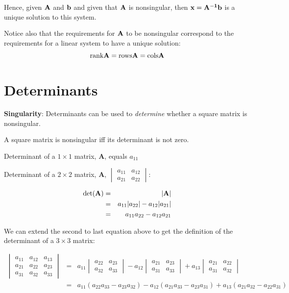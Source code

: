\documentclass[]{book}
\theoremstyle{definition}
\theoremstyle{definition}
\theoremstyle{definition}
\theoremstyle{remark}
\begin{document}
Hence, given \(\bf{A}\) and \(\bf{b}\) and given that \(\bf{A}\) is
nonsingular, then \(\bf{x} = \bf{A}^{-1} \bf{b}\) is a unique solution
to this system.

Notice also that the requirements for \(\bf{A}\) to be nonsingular
correspond to the requirements for a linear system to have a unique
solution: \[\text{rank}\bf{A} = \text{rows}\bf{A} = \text{cols}\bf{A}\]

\section{Determinants}\label{determinants}

\textbf{Singularity}: Determinants can be used to \emph{determine}
whether a square matrix is nonsingular.

A square matrix is nonsingular iff its determinant is not zero.

Determinant of a \(1 \times 1\) matrix, \textbf{A}, equals \(a_{11}\)

Determinant of a \(2 \times 2\) matrix, \textbf{A},
\(\begin{vmatrix} a_{11}&a_{12}\\  a_{21}&a_{22} \end{vmatrix}\):

\begin{eqnarray*}
\det({\bf A}) &=& |{\bf A}|\\
            &=& a_{11}|a_{22}| - a_{12}|a_{21}|\\
            &=& a_{11}a_{22} - a_{12}a_{21}
\end{eqnarray*}

We can extend the second to last equation above to get the definition of
the determinant of a \(3 \times 3\) matrix:

\begin{eqnarray*}
            \begin{vmatrix} a_{11}&a_{12}&a_{13}\\  a_{21} & a_{22}&a_{23}\\ a_{31}&a_{32}&a_{33} \end{vmatrix} 
                &=& 
                a_{11} \begin{vmatrix} a_{22}&a_{23}\\ a_{32}&a_{33} \end{vmatrix}
                - a_{12} \begin{vmatrix} a_{21}&a_{23}\\ a_{31}&a_{33} \end{vmatrix}
                + a_{13} \begin{vmatrix} a_{21}&a_{22}\\ a_{31}&a_{32} 
                \end{vmatrix}\\
                &=& a_{11}(a_{22}a_{33} - a_{23}a_{32}) - a_{12}(a_{21}a_{33} - a_{23}a_{31}) + a_{13}(a_{21}a_{32} - a_{22}a_{31})
\end{eqnarray*}
\end{document}
